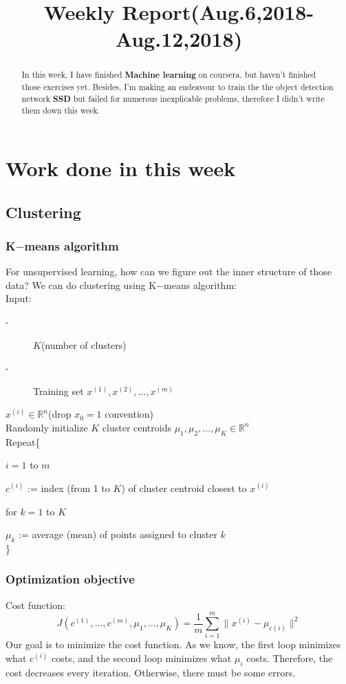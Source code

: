 \documentclass{article}
\title{Weekly Report(Aug.6,2018-Aug.12,2018)}
\begin{document}
\maketitle

\begin{abstract}
  In this week, I have finished \textbf{Machine learning} on coursera, but haven't finished those exercises yet. Besides, I'm making an endeavour to train the the object detection network \textbf{SSD} but failed for numerous inexplicable problems, therefore I didn't write them down this week.
\end{abstract}

\section{Work done in this week}
\subsection{Clustering}
\subsubsection{K$-$means algorithm}
For unsupervised learning, how can we figure out the inner structure of those data? We can do clustering using K$-$means algorithm:\\
Input:
\begin{description}
  \item[-] $K$(number of clusters)
  \item[-] Training set ${x^{(1)}, x^{(2)}, \ldots, x^{(m)}}$
\end{description}
$x^{(i)} \in \mathbb{R}^n$(drop $x_0 = 1$ convention)\\
Randomly initialize $K$ cluster centroids $\mu_1, \mu_2, \ldots, \mu_K \in \mathbb{R}^n$\\
Repeat\{\par
\hspace{1cm} $i = 1$ to $m$\par
\hspace{2cm}$c^{(i)}$ := index (from 1 to $K$) of cluster centroid closest to $x^{(i)}$\par
\hspace{1cm}for $k = 1$ to $K$\par
\hspace{2cm}$\mu_k$ := average (mean) of points assigned to cluster $k$\\
\}

\subsubsection{Optimization objective}
Cost function:\[J(c^{(1)}, \ldots, c^{(m)}, \mu_1, \ldots, \mu_K) = \frac{1}{m}\sum\limits_{i=1}^{m}\|x^{(i)} - \mu_{c(i)}\|^2\]
Our goal is to minimize the cost function. As we know, the first loop minimizes what $c^{(i)}$ costs, and the second loop minimizes what $\mu_i$ costs. Therefore, the cost
decreases every iteration. Otherwise, there must be some errors.
\end{document}
